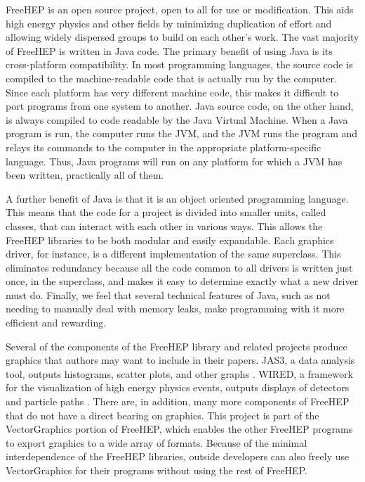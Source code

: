 \documentclass[11pt]{report}
\begin{document}

FreeHEP is an open source project, open to all for use or modification. This aids high energy physics and other fields by minimizing duplication of effort and allowing widely dispersed groups to build on each other's work. The vast majority of FreeHEP is written in Java code. The primary benefit of using Java is its cross-platform compatibility. In most programming languages, the source code is compiled to the machine-readable code that is actually run by the computer. Since each platform has very different machine code, this makes it difficult to port programs from one system to another. Java source code, on the other hand, is always compiled to code readable by the Java Virtual Machine. When a Java program is run, the computer runs the JVM, and the JVM runs the program and relays its commands to the computer in the appropriate platform-specific language. Thus, Java programs will run on any platform for which a JVM has been written, practically all of them.

A further benefit of Java is that it is an object oriented programming language. This means that the code for a project is divided into smaller units, called classes, that can interact with each other in various ways. This allows the FreeHEP libraries to be both modular and easily expandable. Each graphics driver, for instance, is a different implementation of the same superclass. This eliminates redundancy because all the code common to all drivers is written just once, in the superclass, and makes it easy to determine exactly what a new driver must do. Finally, we feel that several technical features of Java, such as not needing to manually deal with memory leaks, make programming with it more efficient and rewarding. 

Several of the components of the FreeHEP library and related projects produce graphics that authors may want to include in their papers. JAS3, a data analysis tool, outputs histograms, scatter plots, and other graphs \cite{jas3:web}. WIRED, a framework for the visualization of high energy physics events, outputs displays of detectors and particle paths \cite{bal, wired:web}. There are, in addition, many more components of FreeHEP that do not have a direct bearing on graphics. This project is part of the VectorGraphics portion of FreeHEP, which enables the other FreeHEP programs to export graphics to a wide array of formats. Because of the minimal interdependence of the FreeHEP libraries, outside developers can also freely use VectorGraphics for their programs without using the rest of FreeHEP\@.
\end{document}
